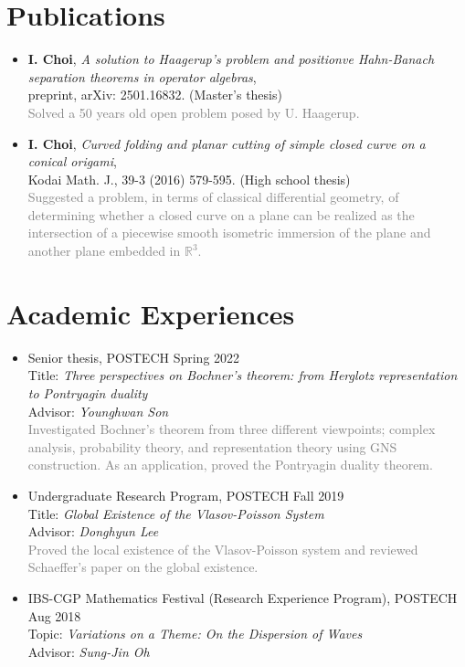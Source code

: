 \documentclass[11pt,a4paper]{article}
\begin{document}
\section*{Publications}
\begin{itemize}
\item
	\textbf{I. Choi},
	\emph{A solution to Haagerup's problem and positionve Hahn-Banach separation theorems in operator algebras},\\
	preprint, arXiv: 2501.16832. (Master's thesis)\\
	\textcolor{gray}{Solved a 50 years old open problem posed by U. Haagerup.}
\item
	\textbf{I. Choi},
	\emph{Curved folding and planar cutting of simple closed curve on a conical origami},\\
	Kodai Math. J., 39-3 (2016) 579-595. (High school thesis)\\
	\textcolor{gray}{Suggested a problem, in terms of classical differential geometry, of determining whether a closed curve on a plane can be realized as the intersection of a piecewise smooth isometric immersion of the plane and another plane embedded in $\mathbb{R}^3$.}
\end{itemize}



\section*{Academic Experiences}
\begin{itemize}
\item
	Senior thesis, POSTECH
	\hfill{\small Spring 2022}\\
	Title: \emph{Three perspectives on Bochner's theorem: from Herglotz representation to Pontryagin duality}\\
	Advisor: \emph{Younghwan Son}\\
	\textcolor{gray}{Investigated Bochner's theorem from three different viewpoints; complex analysis, probability theory, and representation theory using GNS construction. As an application, proved the Pontryagin duality theorem.}

\item
	Undergraduate Research Program, POSTECH
	\hfill{\small Fall 2019}\\
	Title: \emph{Global Existence of the Vlasov-Poisson System}\\
	Advisor: \emph{Donghyun Lee}\\
	\textcolor{gray}{Proved the local existence of the Vlasov-Poisson system and reviewed Schaeffer's paper on the global existence.}
\item IBS-CGP Mathematics Festival (Research Experience Program), POSTECH
	\hfill{\small Aug 2018}\\
	Topic: \emph{Variations on a Theme: On the Dispersion of Waves}\\
	Advisor: \emph{Sung-Jin Oh}
\end{itemize}
\end{document}
